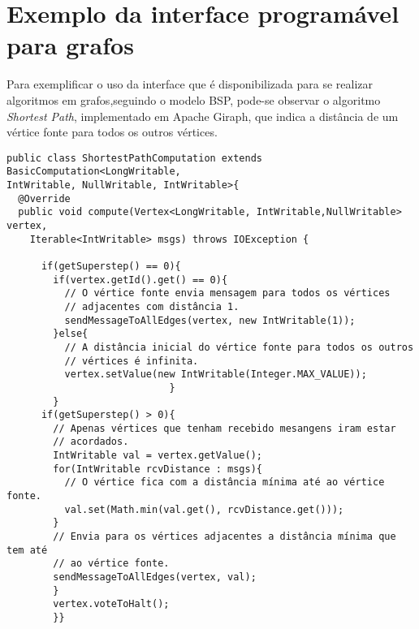 \section{Exemplo da interface programável para grafos}

Para exemplificar o uso da interface que é disponibilizada para se 
realizar algoritmos em grafos,seguindo o modelo BSP, pode-se observar o 
algoritmo \textit{Shortest Path}, implementado em Apache Giraph, que indica a 
distância de um vértice fonte para todos os outros vértices.
\newpage
\begin{verbatim}
public class ShortestPathComputation extends BasicComputation<LongWritable, 
IntWritable, NullWritable, IntWritable>{
  @Override
  public void compute(Vertex<LongWritable, IntWritable,NullWritable> vertex, 
	Iterable<IntWritable> msgs) throws IOException {
	
	  if(getSuperstep() == 0){
	    if(vertex.getId().get() == 0){
	      // O vértice fonte envia mensagem para todos os vértices 
	      // adjacentes com distância 1.
	      sendMessageToAllEdges(vertex, new IntWritable(1));
	    }else{
	      // A distância inicial do vértice fonte para todos os outros 
	      // vértices é infinita.
	      vertex.setValue(new IntWritable(Integer.MAX_VALUE));
							}
		}
	  if(getSuperstep() > 0){
	    // Apenas vértices que tenham recebido mesangens iram estar 
	    // acordados.
	    IntWritable val = vertex.getValue();		
	    for(IntWritable rcvDistance : msgs){
	      // O vértice fica com a distância mínima até ao vértice fonte.
	      val.set(Math.min(val.get(), rcvDistance.get()));
	    }
	    // Envia para os vértices adjacentes a distância mínima que tem até 
	    // ao vértice fonte.
	    sendMessageToAllEdges(vertex, val);		
		} 
		vertex.voteToHalt();
		}}
\end{verbatim}

